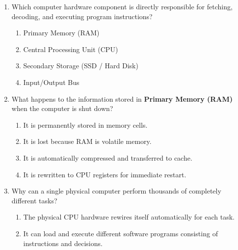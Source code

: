 \documentclass[11pt,a4paper]{article}
\begin{document}
\begin{enumerate}[label=\textbf{Q\arabic*.},leftmargin=2em,itemsep=2pt,topsep=1pt]

  \item Which computer hardware component is directly responsible for fetching, decoding, and executing program instructions?

  \begin{enumerate}[label=\Alph*.,noitemsep,topsep=0.5pt,leftmargin=2em]

    \item Primary Memory (RAM)

    \item Central Processing Unit (CPU)

    \item Secondary Storage (SSD / Hard Disk)

    \item Input/Output Bus

  \end{enumerate}

  \item What happens to the information stored in \textbf{Primary Memory (RAM)} when the computer is shut down?

  \begin{enumerate}[label=\Alph*.,noitemsep,topsep=0.5pt,leftmargin=2em]

    \item It is permanently stored in memory cells.

    \item It is lost because RAM is volatile memory.

    \item It is automatically compressed and transferred to cache.

    \item It is rewritten to CPU registers for immediate restart.

  \end{enumerate}

  \item Why can a single physical computer perform thousands of completely different tasks?

  \begin{enumerate}[label=\Alph*.,noitemsep,topsep=0.5pt,leftmargin=2em]

    \item The physical CPU hardware rewires itself automatically for each task.

    \item It can load and execute different software programs consisting of instructions and decisions.


\end{enumerate}
\end{enumerate}
\end{document}
